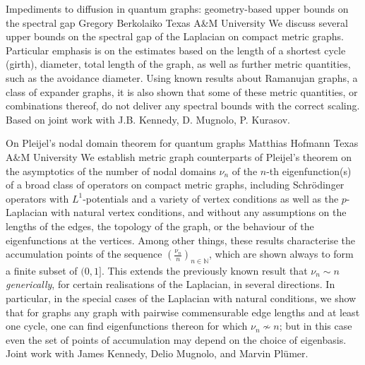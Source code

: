 \begin{addmargin}[2em]{0em}
\vspace{1.5ex}
\abs
{Impediments to diffusion in quantum graphs: geometry-based upper
bounds on the spectral gap}
{Gregory Berkolaiko}
{Texas A\&M University}
{We discuss several upper bounds on the spectral gap of the Laplacian
on compact metric graphs. Particular emphasis is on the estimates
based on the length of a shortest cycle (girth), diameter, total
length of the graph, as well as further metric quantities, such as the
avoidance diameter. Using known results about Ramanujan graphs, a
class of expander graphs, it is also shown that some of these metric
quantities, or combinations thereof, do not deliver any spectral
bounds with the correct scaling.\\
Based on joint work with J.B. Kennedy, D. Mugnolo, P. Kurasov.}


\vspace{1.5ex}
\abs
{On Pleijel's nodal domain theorem for quantum graphs}
{Matthias Hofmann}
{Texas A\&M University}
{We establish metric graph counterparts of Pleijel's theorem on the asymptotics of the number of nodal domains $\nu_n$ of the $n$-th eigenfunction(s) of a broad class of operators on compact metric graphs, including Schr\"{o}dinger operators with $L^1$-potentials and a variety of vertex conditions as well as the $p$-Laplacian with natural vertex conditions, and without any assumptions on the lengths of the edges, the topology of the graph, or the behaviour of the eigenfunctions at the vertices. Among other things, these results characterise the accumulation points of the sequence $(\frac{\nu_n}{n})_{n\in\mathbb{N}}$, which are shown always to form a finite subset of $(0,1]$. This extends the previously known result that $\nu_n\sim n$ \textit{generically}, for certain realisations of the Laplacian, in several directions. In particular, in the special cases of the Laplacian with natural conditions, we show that for graphs any graph with pairwise commensurable edge lengths and at least one cycle, one can find eigenfunctions thereon for which ${\nu_n} \not\sim n$; but in this case even the set of points of accumulation may depend on the choice of eigenbasis.\\
Joint work with James Kennedy, Delio Mugnolo, and Marvin Plümer.}




\end{addmargin}
